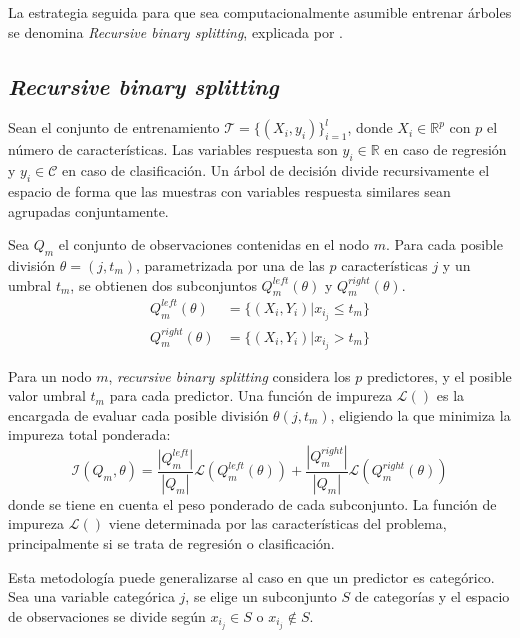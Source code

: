 \documentclass[titlepage, 11pt]{book}
\begin{document}
La estrategia seguida para que sea computacionalmente asumible entrenar árboles se denomina \textit{Recursive binary splitting}, explicada por \cite{CART}.

\subsection*{\textit{Recursive binary splitting}} \label{subsec:RecBinSplit}
Sean el conjunto de entrenamiento $\mathcal{T}= \{(X_i,y_i) \}_{i=1}^{l}$, donde $X_i \in \mathbb{R}^p$ con $p$ el número de características. Las variables respuesta son $y_i \in \mathbb{R}$ en caso de regresión y $y_i \in \mathcal{C}$ en caso de clasificación. Un árbol de decisión divide recursivamente el espacio de forma que las muestras con variables respuesta similares sean agrupadas conjuntamente.

Sea $Q_m$ el conjunto de observaciones contenidas en el nodo $m$. Para cada posible división $\theta =(j,t_m)$, parametrizada por una de las $p$ características $j$ y un umbral $t_m$, se obtienen dos subconjuntos $Q^{left}_m(\theta)$ y $Q^{right}_m(\theta)$.
\begin{equation*}
    \begin{split}
        Q^{left}_m(\theta) &= \{ (X_i,Y_i)|x_{i_j} \leq t_m \} \\
        Q^{right}_m(\theta) &= \{ (X_i,Y_i)|x_{i_j} > t_m \}
    \end{split}
\end{equation*}


Para un nodo $m$, \textit{recursive binary splitting} considera los $p$ predictores, y el posible valor umbral $t_m$ para cada predictor. Una función de impureza $\mathcal{L}()$ es la encargada de evaluar cada posible división $\theta(j,t_m)$, eligiendo la que minimiza la impureza total ponderada:
\begin{equation}
    \mathcal{I}(Q_m,\theta)= \frac{|Q^{left}_m|}{|Q_m|}\mathcal{L}(Q^{left}_m(\theta))+\frac{|Q^{right}_m|}{|Q_m|}\mathcal{L}(Q^{right}_m(\theta))
    \label{eq:ImpPond}
\end{equation}
donde se tiene en cuenta el peso ponderado de cada subconjunto. La función de impureza $\mathcal{L}()$ viene determinada por las características del problema, principalmente si se trata de regresión o clasificación.

Esta metodología puede generalizarse al caso en que un predictor es categórico. Sea una variable categórica $j$, se elige un subconjunto $S$ de categorías y el espacio de observaciones se divide según $x_{i_j} \in S$ o $x_{i_j} \notin S$.
\end{document}
